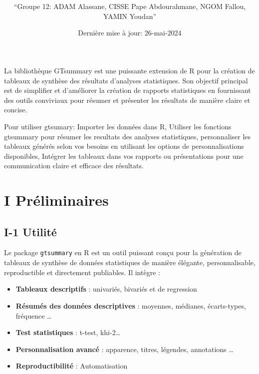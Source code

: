 \documentclass[
]{article}
\title{\begin{center}\begin{tcolorbox}[colback=myblue!20!white,colframe=myblue!75!black,title={\textcolor{white}{\centering\bfseries Projet- logiciel statistique R: Le package gtsumary}}]\end{tcolorbox}\end{center}}
\author{``Groupe 12: ADAM Alassane, CISSE Pape Abdourahmane, NGOM
Fallou, YAMIN Youdan''}
\date{Dernière mise à jour: 26-mai-2024}
\begin{document}
\maketitle

\pagestyle{fancy}
\fancyhf{}
\fancyfoot[R]{\thepage}

\maketitle

\newpage
\tableofcontents
\newpage

\begin{tcolorbox}[colback=red!5!white,colframe=black,title=Note,sharp corners]
La bibliothèque GTsummary est une puissante extension de R pour la création de tableaux de synthèse des résultats d'analyses statistiques. Son objectif principal est de simplifier et d'améliorer la création de rapports statistiques en fournissant des outils conviviaux pour résumer et présenter les résultats de manière claire et concise.

Pour utiliser gtsumary: Importer les données dans R, Utiliser les fonctions gtsummary pour résumer les resultats des analyses statistiques, personnaliser les tableaux générés selon vos besoins en utilisant les options de personnalisations disponibles, Intégrer les tableaux dans vos rapports ou présentations pour une communication claire et efficace des résultats.


\end{tcolorbox}

\hypertarget{i-pruxe9liminaires}{%
\section{I Préliminaires}\label{i-pruxe9liminaires}}

\hypertarget{i-1-utilituxe9}{%
\subsection{I-1 Utilité}\label{i-1-utilituxe9}}

Le package \texttt{gtsummary} en R est un outil puissant conçu pour la
génération de tableaux de synthèse de données statistiques de manière
élégante, personnalisable, reproductible et directement publiables. Il
intègre :

\begin{itemize}
\item
  \textbf{Tableaux descriptifs} : univariés, bivariés et de regression
\item
  \textbf{Résumés des données descriptives} : moyennes, médianes,
  écarts-types, fréquence \ldots{}
\item
  \textbf{Test statistiques} : t-test, khi-2\ldots{}
\item
  \textbf{Personnalisation avancé} : apparence, titres, légendes,
  annotations \ldots{}
\item
  \textbf{Reproductibilité} : Automatisation
\end{itemize}
\end{document}
